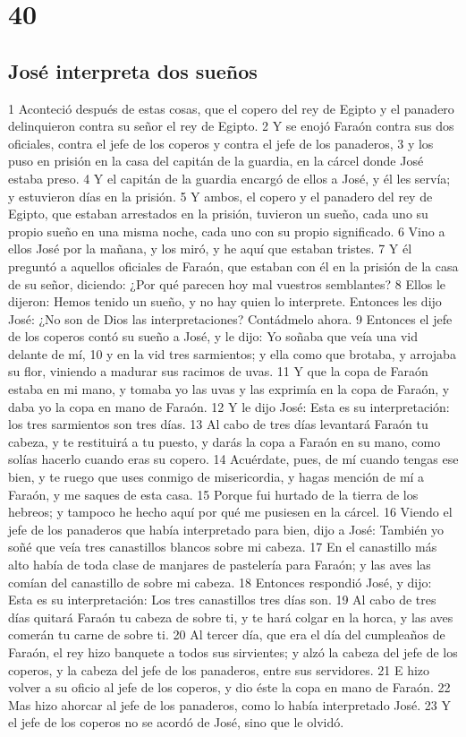 \chapter{40}

\section{José interpreta dos sueños}

1 Aconteció después de estas cosas, que el copero del rey de Egipto y el panadero delinquieron contra su señor el rey de Egipto.
2 Y se enojó Faraón contra sus dos oficiales, contra el jefe de los coperos y contra el jefe de los panaderos,
3 y los puso en prisión en la casa del capitán de la guardia, en la cárcel donde José estaba preso.
4 Y el capitán de la guardia encargó de ellos a José, y él les servía; y estuvieron días en la prisión.
5 Y ambos, el copero y el panadero del rey de Egipto, que estaban arrestados en la prisión, tuvieron un sueño, cada uno su propio sueño en una misma noche, cada uno con su propio significado.
6 Vino a ellos José por la mañana, y los miró, y he aquí que estaban tristes.
7 Y él preguntó a aquellos oficiales de Faraón, que estaban con él en la prisión de la casa de su señor, diciendo: ¿Por qué parecen hoy mal vuestros semblantes?
8 Ellos le dijeron: Hemos tenido un sueño, y no hay quien lo interprete. Entonces les dijo José: ¿No son de Dios las interpretaciones? Contádmelo ahora.
9 Entonces el jefe de los coperos contó su sueño a José, y le dijo: Yo soñaba que veía una vid delante de mí,
10 y en la vid tres sarmientos; y ella como que brotaba, y arrojaba su flor, viniendo a madurar sus racimos de uvas.
11 Y que la copa de Faraón estaba en mi mano, y tomaba yo las uvas y las exprimía en la copa de Faraón, y daba yo la copa en mano de Faraón.
12 Y le dijo José: Esta es su interpretación: los tres sarmientos son tres días.
13 Al cabo de tres días levantará Faraón tu cabeza, y te restituirá a tu puesto, y darás la copa a Faraón en su mano, como solías hacerlo cuando eras su copero.
14 Acuérdate, pues, de mí cuando tengas ese bien, y te ruego que uses conmigo de misericordia, y hagas mención de mí a Faraón, y me saques de esta casa.
15 Porque fui hurtado de la tierra de los hebreos; y tampoco he hecho aquí por qué me pusiesen en la cárcel.
16 Viendo el jefe de los panaderos que había interpretado para bien, dijo a José: También yo soñé que veía tres canastillos blancos sobre mi cabeza.
17 En el canastillo más alto había de toda clase de manjares de pastelería para Faraón; y las aves las comían del canastillo de sobre mi cabeza.
18 Entonces respondió José, y dijo: Esta es su interpretación: Los tres canastillos tres días son.
19 Al cabo de tres días quitará Faraón tu cabeza de sobre ti, y te hará colgar en la horca, y las aves comerán tu carne de sobre ti.
20 Al tercer día, que era el día del cumpleaños de Faraón, el rey hizo banquete a todos sus sirvientes; y alzó la cabeza del jefe de los coperos, y la cabeza del jefe de los panaderos, entre sus servidores.
21 E hizo volver a su oficio al jefe de los coperos, y dio éste la copa en mano de Faraón.
22 Mas hizo ahorcar al jefe de los panaderos, como lo había interpretado José.
23 Y el jefe de los coperos no se acordó de José, sino que le olvidó.

